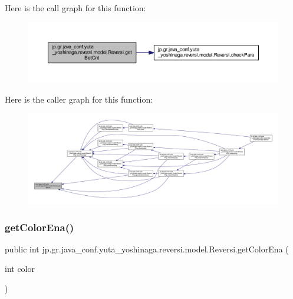 Here is the call graph for this function\+:\nopagebreak
\begin{figure}[H]
\begin{center}
\leavevmode
\includegraphics[width=350pt]{classjp_1_1gr_1_1java__conf_1_1yuta__yoshinaga_1_1reversi_1_1model_1_1_reversi_a9f826e110ec3298a6bc5d6987a94519c_cgraph}
\end{center}
\end{figure}
Here is the caller graph for this function\+:\nopagebreak
\begin{figure}[H]
\begin{center}
\leavevmode
\includegraphics[width=350pt]{classjp_1_1gr_1_1java__conf_1_1yuta__yoshinaga_1_1reversi_1_1model_1_1_reversi_a9f826e110ec3298a6bc5d6987a94519c_icgraph}
\end{center}
\end{figure}
\mbox{\label{classjp_1_1gr_1_1java__conf_1_1yuta__yoshinaga_1_1reversi_1_1model_1_1_reversi_ac6fafa41eeff56abfc67b2b5876b50f9}} 
\subsubsection{\texorpdfstring{get\+Color\+Ena()}{getColorEna()}}
{\footnotesize\ttfamily public int jp.\+gr.\+java\+\_\+conf.\+yuta\+\_\+yoshinaga.\+reversi.\+model.\+Reversi.\+get\+Color\+Ena (\begin{DoxyParamCaption}\item[{int}]{color }\end{DoxyParamCaption})}



